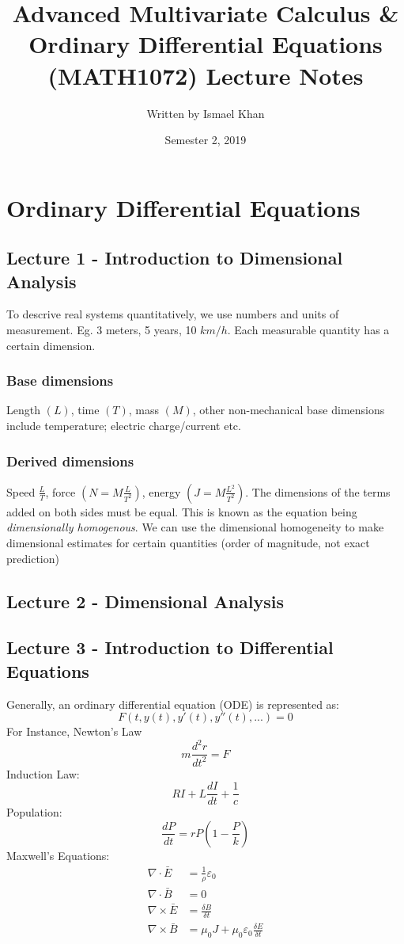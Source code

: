 \documentclass{report}
\title{Advanced Multivariate Calculus \& Ordinary Differential Equations
(MATH1072) Lecture Notes}
\author{Written by Ismael Khan}
\date{Semester 2, 2019}
\theoremstyle{definition}
\theoremstyle{plain}
\theoremstyle{remark}
\begin{document}
	\maketitle
      	\chapter{Ordinary Differential Equations}
	\section{Lecture 1 - Introduction to Dimensional Analysis}
	To descrive real systems quantitatively, we use numbers and units of
	measurement. Eg. 3 meters, 5 years, 10 $ km/h $.
	Each measurable quantity has a certain dimension.
	\subsection{Base dimensions}
	Length $ (L) $, time $ (T) $, mass $ (M) $, other non-mechanical base
	dimensions include temperature; electric charge/current etc.
	\subsection{Derived dimensions}
	Speed $ \displaystyle \frac{L}{T} $, force $ (
	N = M \displaystyle \frac{L}{T^2}) $, energy $ (J = M \displaystyle
	\frac{L^2}{T^2}) $. The dimensions of the terms added on both sides
	must be equal. This is known as the equation being
	\textit{dimensionally homogenous}. We can use the dimensional
	homogeneity to make dimensional estimates for certain quantities
	(order of magnitude, not exact prediction)
	\section{Lecture 2 - Dimensional Analysis}
	\section{Lecture 3 - Introduction to Differential Equations}
	\noindent Generally, an ordinary differential equation (ODE) is represented as:
	$$ F(t,y(t), y'(t), y''(t), ...)  = 0 $$
	For Instance, Newton's Law
	$$ m \frac{d^2 r}{dt^2} = F $$
	Induction Law:
	$$ RI + L \frac{dI}{dt} + \frac{1}{c} $$
	Population:
	$$ \frac{dP}{dt} = rP(1- \frac{P}{k})$$
	Maxwell's Equations:
	\begin{align*}
		\nabla \cdot \bar{E} &= \frac{1}{\rho} \varepsilon_0 \\
		\nabla \cdot \bar{B} &= 0 \\
		\nabla \times \bar{E} &= \frac{\delta B}{\delta t} \\
		\nabla \times \bar{B} &= \mu_0 J + \mu_0 \varepsilon_0 \frac{\delta E}{\delta t}
	\end{align*}
\end{document}

